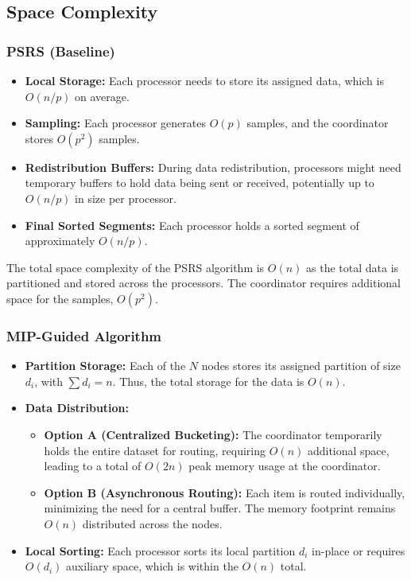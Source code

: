 \documentclass[]{interact}
\theoremstyle{plain}
\theoremstyle{definition}
\theoremstyle{remark}
\begin{document}
\subsection{Space Complexity}

\subsubsection{PSRS (Baseline)}

\begin{itemize}
    \item \textbf{Local Storage:} Each processor needs to store its assigned data, which is $O(n/p)$ on average.
    \item \textbf{Sampling:} Each processor generates $O(p)$ samples, and the coordinator stores $O(p^2)$ samples.
    \item \textbf{Redistribution Buffers:} During data redistribution, processors might need temporary buffers to hold data being sent or received, potentially up to $O(n/p)$ in size per processor.
    \item \textbf{Final Sorted Segments:} Each processor holds a sorted segment of approximately $O(n/p)$.
\end{itemize}

The total space complexity of the PSRS algorithm is $O(n)$ as the total data is partitioned and stored across the processors. The coordinator requires additional space for the samples, $O(p^2)$.

\subsubsection{MIP-Guided Algorithm}

\begin{itemize}
    \item \textbf{Partition Storage:} Each of the $N$ nodes stores its assigned partition of size $d_i$, with $\sum d_i = n$. Thus, the total storage for the data is $O(n)$.
    \item \textbf{Data Distribution:}
    \begin{itemize}
        \item \textbf{Option A (Centralized Bucketing):} The coordinator temporarily holds the entire dataset for routing, requiring $O(n)$ additional space, leading to a total of $O(2n)$ peak memory usage at the coordinator.
        \item \textbf{Option B (Asynchronous Routing):} Each item is routed individually, minimizing the need for a central buffer. The memory footprint remains $O(n)$ distributed across the nodes.
    \end{itemize}
    \item \textbf{Local Sorting:} Each processor sorts its local partition $d_i$ in-place or requires $O(d_i)$ auxiliary space, which is within the $O(n)$ total.
\end{itemize}
\end{document}
